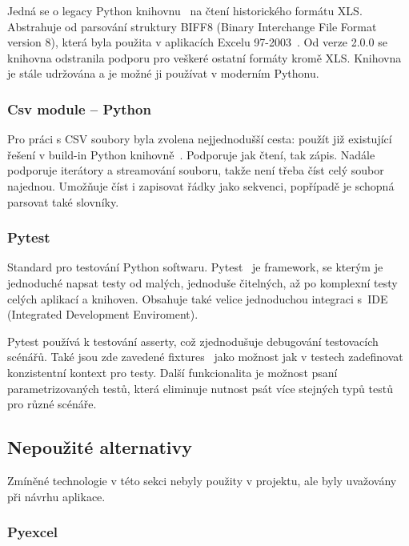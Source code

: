 Jedná se o legacy Python knihovnu~\cite{xlrdDocs} na čtení historického formátu XLS. Abstrahuje od parsování struktury BIFF8 (Binary Interchange File Format version 8), která byla použita v aplikacích Excelu 97-2003~\cite{xlsFormat}. Od verze 2.0.0 se knihovna odstranila podporu pro veškeré ostatní formáty kromě XLS. Knihovna je stále udržována a je možné ji používat v moderním Pythonu.~\cite{xlrdChanges} 

\subsubsection{Csv module – Python}

Pro práci s CSV soubory byla zvolena nejjednodušší cesta: použít již existující řešení v build-in Python knihovně~\cite{CsvDocs}. Podporuje jak čtení, tak zápis. Nadále podporuje iterátory a streamování souboru, takže není třeba číst celý soubor najednou. Umožňuje číst i zapisovat řádky jako sekvenci, popřípadě je schopná parsovat také slovníky.

\subsubsection{Pytest}
\label{Pytest}

Standard pro testování Python softwaru. Pytest~\cite{Pytest} je framework, se kterým je jednoduché napsat testy od malých, jednoduše čitelných, až po komplexní testy celých aplikací a knihoven. Obsahuje také velice jednoduchou integraci s~IDE (Integrated Development Enviroment).

Pytest používá k testování asserty, což zjednodušuje debugování testovacích scénářů. Také jsou zde zavedené fixtures~\cite{PytestFixtures} jako možnost jak v testech zadefinovat konzistentní kontext pro testy. Další funkcionalita je možnost psaní parametrizovaných testů, která eliminuje nutnost psát více stejných typů testů pro různé scénáře.

\subsection{Nepoužité alternativy}

Zmíněné technologie v této sekci nebyly použity v projektu, ale byly uvažovány při návrhu aplikace.

\subsubsection{Pyexcel}

